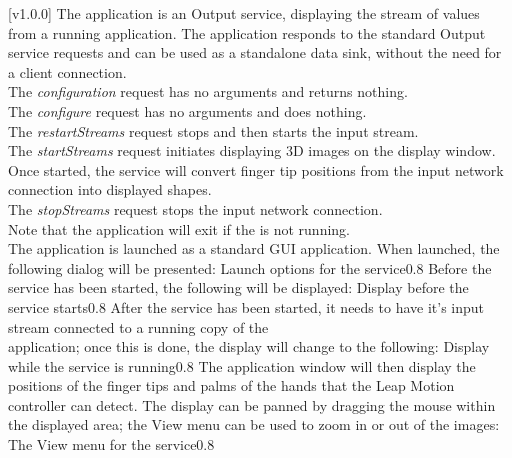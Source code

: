 [v1.0.0]
The  application is an Output service, displaying the
stream of values from a running  application.
The application responds to the standard Output service requests and can be used as a
standalone data sink, without the need for a client connection.\\

The \emph{configuration} request has no arguments and returns nothing.\\

The \emph{configure} request has no arguments and does nothing.\\

The \emph{restartStreams} request stops and then starts the input stream.\\

The \emph{startStreams} request initiates displaying 3D images on the display window.
Once started, the service will convert finger tip positions from the input \yarp{} network
connection into displayed shapes.\\

The \emph{stopStreams} request stops the input \yarp{} network connection.\\ 

Note that the application will exit if the \emph{\RS} is not running.\\

The  application is launched as a standard GUI
application.
When launched, the following dialog will be presented:
%
{Launch options for the \emph{\LDO} service}{0.8}
\condPage{}
Before the service has been started, the following will be displayed:
%
{Display before the \emph{\LDO} service starts}{0.8}
\condPage{}
After the service has been started, it needs to have it's input stream connected to a
running copy of the\\
 application;
once this is done, the display will change to the following:
%
{Display while the \emph{\LDO} service is running}{0.8}
\condPage{}
The  application window will then display the
positions of the finger tips and palms of the hands that the Leap Motion controller can
detect.
The display can be panned by dragging the mouse within the displayed area; the View menu
can be used to zoom in or out of the images:
%
{The View menu for the \emph{\LDO} service}{0.8}
\primaryEnd{}
